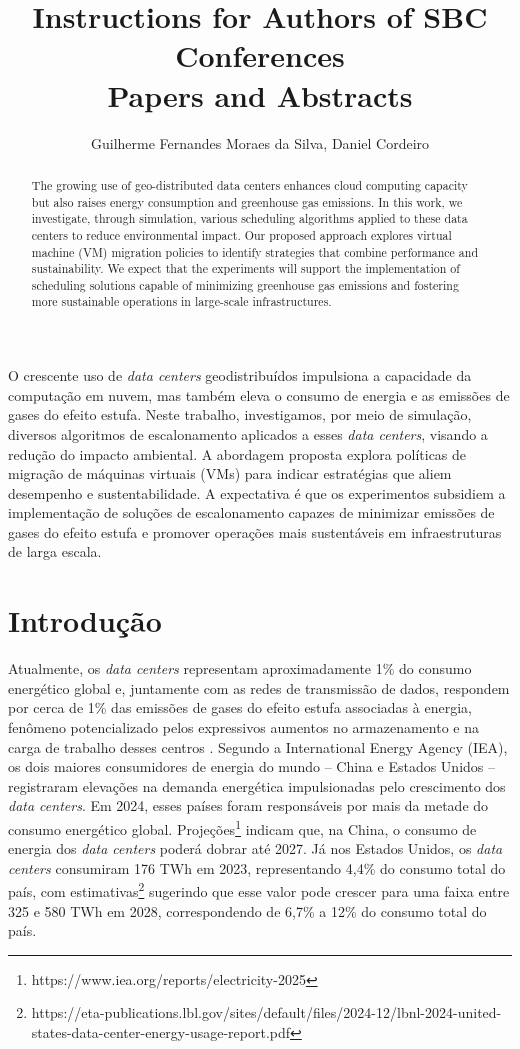 \documentclass[12pt]{article}
\title{Instructions for Authors of SBC Conferences\\ Papers and Abstracts}
\author{Guilherme Fernandes Moraes da Silva\inst{1}, Daniel Cordeiro\inst{1}}
\begin{document}
 

\maketitle

\begin{abstract}
The growing use of geo-distributed data centers enhances cloud computing capacity but also raises energy consumption and greenhouse gas emissions. In this work, we investigate, through simulation, various scheduling algorithms applied to these data centers to reduce environmental impact. Our proposed approach explores virtual machine (VM) migration policies to identify strategies that combine performance and sustainability. We expect that the experiments will support the implementation of scheduling solutions capable of minimizing greenhouse gas emissions and fostering more sustainable operations in large-scale infrastructures.
\end{abstract}
     
\begin{resumo}
O crescente uso de \textit{data centers} geodistribuídos impulsiona a capacidade da computação em nuvem, mas também eleva o consumo de energia e as emissões de gases do efeito estufa. Neste trabalho, investigamos, por meio de simulação, diversos algoritmos de escalonamento aplicados a esses \textit{data centers}, visando a redução do impacto ambiental. A abordagem proposta explora políticas de migração de máquinas virtuais (VMs) para indicar estratégias que aliem desempenho e sustentabilidade. A expectativa é que os experimentos subsidiem a implementação de soluções de escalonamento capazes de minimizar emissões de gases do efeito estufa e promover operações mais sustentáveis em infraestruturas de larga escala.
\end{resumo}


\section{Introdução}
Atualmente, os \textit{data centers} representam aproximadamente 1\% do consumo energético global e, juntamente com as redes de transmissão de dados, respondem por cerca de 1\% das emissões de gases do efeito estufa associadas à energia, fenômeno potencializado pelos expressivos aumentos no armazenamento e na carga de trabalho desses centros \cite{masanet:20}. Segundo a International Energy Agency (IEA), os dois maiores consumidores de energia do mundo -- China e Estados Unidos -- registraram elevações na demanda energética impulsionadas pelo crescimento dos \textit{data centers}. Em 2024, esses países foram responsáveis por mais da metade do consumo energético global. Projeções\footnote{https://www.iea.org/reports/electricity-2025} indicam que, na China, o consumo de energia dos \textit{data centers} poderá dobrar até 2027. Já nos Estados Unidos, os \textit{data centers} consumiram 176 TWh em 2023, representando 4,4\% do consumo total do país, com estimativas\footnote{https://eta-publications.lbl.gov/sites/default/files/2024-12/lbnl-2024-united-states-data-center-energy-usage-report.pdf} sugerindo que esse valor pode crescer para uma faixa entre 325 e 580 TWh em 2028, correspondendo de 6,7\% a 12\% do consumo total do país.
\end{document}
